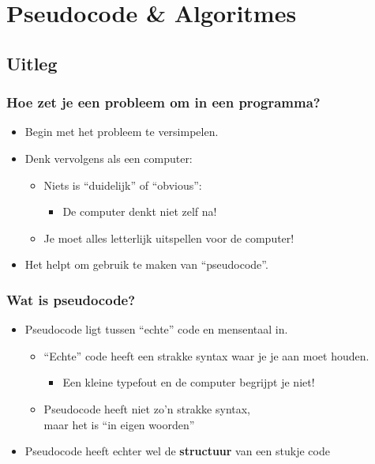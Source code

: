 \section{Pseudocode \& Algoritmes}
\subsection{Uitleg}

\begin{frame}
\frametitle{Hoe zet je een probleem om in een programma?}

\begin{itemize}
  \item<1-> Begin met het probleem te versimpelen.
  \item<2-> Denk vervolgens als een computer:
  \begin{itemize}
  	\item<3-> Niets is ``duidelijk'' of ``obvious'': 
	  \begin{itemize}
	  	\item<4-> De computer denkt niet zelf na!
	  \end{itemize}
  	\item<5-> Je moet alles letterlijk uitspellen voor de computer!
  \end{itemize}
  \item<6-> Het helpt om gebruik te maken van ``pseudocode''.
\end{itemize}

\end{frame}



\begin{frame}
\frametitle{Wat is pseudocode?}

\begin{itemize}
  \item<1-> Pseudocode ligt tussen ``echte'' code en mensentaal in.
  \begin{itemize}
  	\item<2-> ``Echte'' code heeft een strakke syntax waar je je aan moet houden.
  	\begin{itemize}
  	  \item<3-> Een kleine typefout en de computer begrijpt je niet!
  	\end{itemize}
  	\item<4-> Pseudocode heeft niet zo'n strakke syntax,\\maar het is ``in eigen woorden''
  \end{itemize}
  \item<5-> Pseudocode heeft echter wel de \textbf{structuur} van een stukje code
\end{itemize}

\end{frame}




